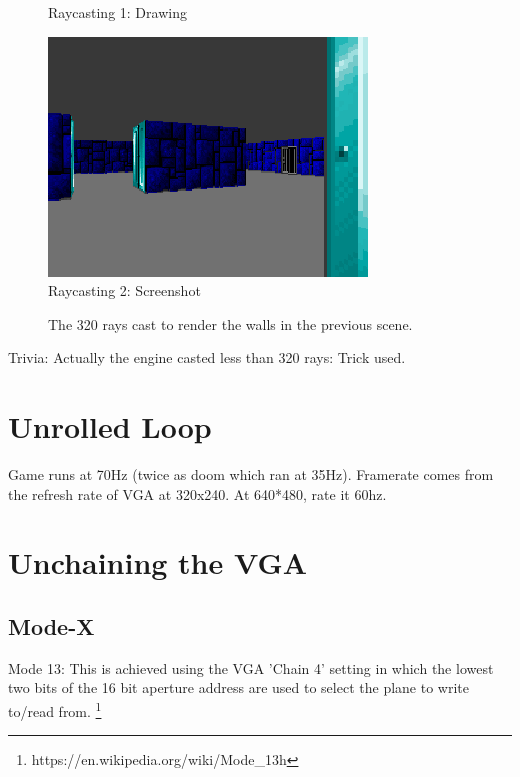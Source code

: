 \begin{figure}[H]
  \centering
  
 \caption{Raycasting 1: Drawing} \label{fig:Raycasting1}
\end{figure}




\begin{figure}[H]
  \centering
 \includegraphics[scale=1.3]{imgs/ray_caster_explained/out_door.png}
 \caption{Raycasting 2: Screenshot} \label{fig:Raycasting2Drawing}
\end{figure}

\begin{figure}[H]
\centering
 
 \caption{The 320 rays cast to render the walls in the previous scene.} \label{fig:Raycasting2}
\end{figure}
 
Trivia: Actually the engine casted less than 320 rays: Trick used.
 

\section{Unrolled Loop}
Game runs at 70Hz (twice as doom which ran at 35Hz). Framerate comes from the refresh rate of VGA at 320x240. At 640*480, rate it 60hz.




\section{Unchaining the VGA}
\subsection{Mode-X}
Mode 13: This is achieved using the VGA 'Chain 4' setting in which the lowest two bits of the 16 bit aperture address are used to select the plane to write to/read from. \footnote{https://en.wikipedia.org/wiki/Mode\_13h}
